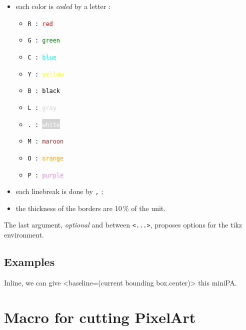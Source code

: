 \documentclass{article}
\begin{document}
\begin{itemize}
	\item each color is \textit{coded} by a letter :
	\begin{multicols}{5}
		\begin{itemize}
			\item \texttt{R : \textcolor{red}{red}}
			\item \texttt{G : \textcolor{green}{green}}
			\item \texttt{C : \textcolor{cyan}{blue}}
			\item \texttt{Y : \textcolor{yellow}{yellow}}
			\item \texttt{B : \textcolor{black}{black}}
			\item \texttt{L : \textcolor{lightgray}{gray}}
			\item \texttt{. : \colorbox{lightgray}{\textcolor{white}{white}}}
			\item \texttt{M : \textcolor{brown}{maroon}}
			\item \texttt{O : \textcolor{orange}{orange}}
			\item \texttt{P : \textcolor{violet}{purple}}
		\end{itemize}
	\end{multicols}
	\item each linebreak is done by \texttt{,} ;
	\item the thickness of the borders are 10\,\% of the unit.
\end{itemize}

The last argument, \textit{optional} and between \texttt{<...>}, proposes options for the \textsf{tikz} environment.

\subsection{Examples}

\begin{PresentationCode}{}
\end{PresentationCode}

\begin{PresentationCode}{}
Inline, we can give <baseline=(current bounding box.center)>
this miniPA.
\end{PresentationCode}

\newpage

\section{Macro for cutting PixelArt}
\end{document}
